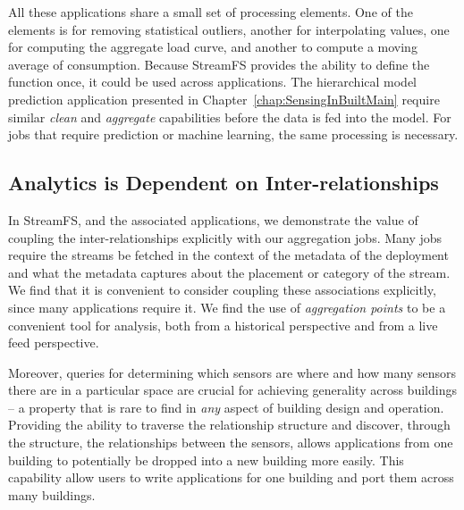 All these applications share a small set of processing elements.  One of the elements is for removing statistical outliers, 
another for interpolating values, one for computing the aggregate load curve, and another to compute a moving average of consumption.
Because StreamFS provides the ability to define the function once, it could be used across applications.
The hierarchical model prediction application presented in Chapter~\ref{chap:SensingInBuiltMain} require similar
\emph{clean} and \emph{aggregate} capabilities before the data is fed into the model.  For jobs that require  
prediction or machine learning, the same processing is necessary.

\subsection{Analytics is Dependent on Inter-relationships}
In StreamFS, and the associated applications, we demonstrate the value of coupling the inter-relationships explicitly with 
our aggregation jobs.  Many jobs require the streams be fetched in the context of the metadata of the deployment and what 
the metadata captures about the placement or category of the stream.  We find that it is convenient to consider
coupling these associations explicitly, since many applications require it.  We find the use of \emph{aggregation points}
to be a convenient tool for analysis, both from a historical perspective and from a live feed perspective.

Moreover, queries for determining which sensors are where and how many sensors there are in a particular space are crucial
for achieving generality across buildings -- a property that is rare to find in \emph{any} aspect of building design and operation.
Providing the ability to traverse the relationship structure and discover, through the structure, the relationships 
between the sensors, allows applications from one building to potentially be dropped into a new building more easily.  
This capability allow users to write applications for one building and port them across many buildings.


